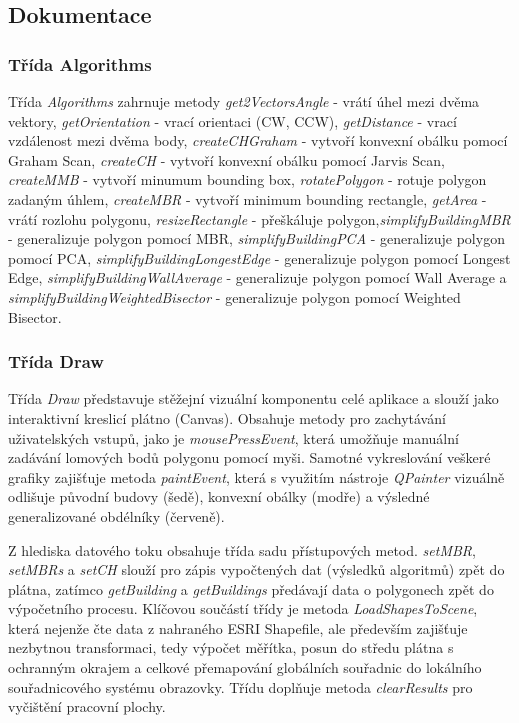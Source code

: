 \subsection{Dokumentace}
\subsubsection{Třída Algorithms}
Třída \textit{Algorithms} zahrnuje metody \textit{get2VectorsAngle} - vrátí úhel mezi dvěma vektory, \textit{getOrientation} - vrací orientaci (CW, CCW), \textit{getDistance} - vrací vzdálenost mezi dvěma body, \textit{createCHGraham} - vytvoří konvexní obálku pomocí Graham Scan, \textit{createCH} - vytvoří konvexní obálku pomocí Jarvis Scan, \textit{createMMB} - vytvoří minumum bounding box, \textit{rotatePolygon} - rotuje polygon zadaným úhlem, \textit{createMBR} - vytvoří minimum bounding rectangle, \textit{getArea} - vrátí rozlohu polygonu,
\textit{resizeRectangle} - přeškáluje polygon,\textit{simplifyBuildingMBR} - generalizuje polygon pomocí MBR, \textit{simplifyBuildingPCA}  - generalizuje polygon pomocí PCA, \textit{simplifyBuildingLongestEdge}  - generalizuje polygon pomocí Longest Edge, \textit{simplifyBuildingWallAverage}  - generalizuje polygon pomocí Wall Average a \textit{simplifyBuildingWeightedBisector}  - generalizuje polygon pomocí Weighted Bisector.



\subsubsection{Třída Draw}
Třída \textit{Draw} představuje stěžejní vizuální komponentu celé aplikace a slouží jako interaktivní kreslicí plátno (Canvas). Obsahuje metody pro zachytávání uživatelských vstupů, jako je \textit{mousePressEvent}, která umožňuje manuální zadávání lomových bodů polygonu pomocí myši. Samotné vykreslování veškeré grafiky zajišťuje metoda \textit{paintEvent}, která s využitím nástroje \textit{QPainter} vizuálně odlišuje původní budovy (šedě), konvexní obálky (modře) a výsledné generalizované obdélníky (červeně). 

Z hlediska datového toku obsahuje třída sadu přístupových metod. \textit{setMBR}, \textit{setMBRs} a \textit{setCH} slouží pro zápis vypočtených dat (výsledků algoritmů) zpět do plátna, zatímco \textit{getBuilding} a \textit{getBuildings} předávají data o polygonech zpět do výpočetního procesu. Klíčovou součástí třídy je metoda \textit{LoadShapesToScene}, která nejenže čte data z nahraného ESRI Shapefile, ale především zajišťuje nezbytnou transformaci, tedy výpočet měřítka, posun do středu plátna s ochranným okrajem a celkové přemapování globálních souřadnic do lokálního souřadnicového systému obrazovky. Třídu doplňuje metoda \textit{clearResults} pro vyčištění pracovní plochy.

